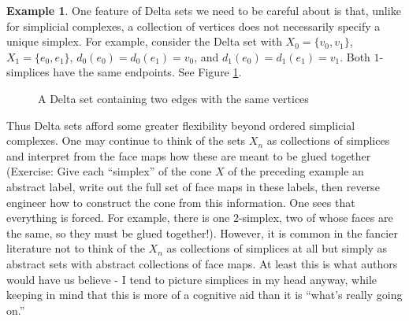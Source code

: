 \documentclass[12pt]{article}
\theoremstyle{plain}
\theoremstyle{definition}
\newtheorem{example}[theorem]{Example}
\begin{document}
\begin{example}\label{E: nonuniqueness}
One feature of Delta sets we need to be careful about is that, unlike for simplicial complexes, a collection of vertices does not necessarily specify a unique simplex. For example, consider the Delta set with $X_0=\{v_0,v_1\}$, $X_1=\{e_0,e_1\}$, $d_0(e_0)=d_0(e_1)=v_0$, and $d_1(e_0)=d_1(e_1)=v_1$. Both $1$-simplices have the same endpoints. See Figure \ref{F: fig15}.
\begin{figure}[!htp]
\begin{center}
\end{center}
\caption{A Delta set containing two edges with the same vertices}\label{F: fig15}
\end{figure}
\end{example}



Thus Delta sets afford some greater flexibility beyond ordered simplicial complexes. One may continue to think of the sets $X_n$ as collections of simplices and interpret from the face maps how these are meant to be glued together (Exercise: Give each ``simplex'' of the cone $X$ of the preceding example an abstract label, write out the full set of face maps in these labels, then reverse engineer how to construct the cone from this information. One sees that everything is forced. For example, there is one $2$-simplex, two of whose faces are the same, so they must be glued together!). However, it is common in the fancier literature not to think of the $X_n$ as collections of simplices at all but simply as abstract sets with abstract collections of face maps. At least this is what authors would have us believe - I tend to picture simplices in my head anyway, while keeping in mind that this is more of a cognitive aid than it is ``what's really going on.''
\end{document}
